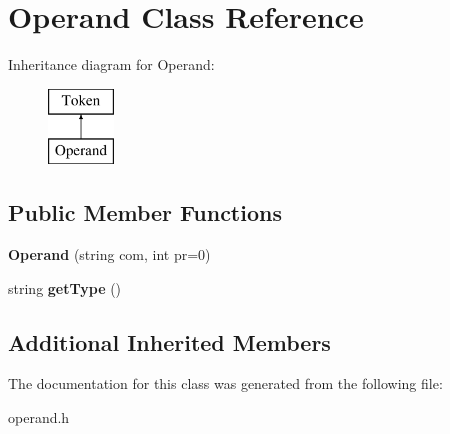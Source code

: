 \hypertarget{classOperand}{\section{Operand Class Reference}
\label{classOperand}
}
Inheritance diagram for Operand\-:\begin{figure}[H]
\begin{center}
\leavevmode
\includegraphics[height=2.000000cm]{classOperand}
\end{center}
\end{figure}
\subsection*{Public Member Functions}
\begin{DoxyCompactItemize}
\item 
\hypertarget{classOperand_a98476572f3aad95c3c5c95c25acdfeda}{{\bfseries Operand} (string com, int pr=0)}\label{classOperand_a98476572f3aad95c3c5c95c25acdfeda}

\item 
\hypertarget{classOperand_a5893a086c18e7d69ca78ae42380302c7}{string {\bfseries get\-Type} ()}\label{classOperand_a5893a086c18e7d69ca78ae42380302c7}

\end{DoxyCompactItemize}
\subsection*{Additional Inherited Members}


The documentation for this class was generated from the following file\-:\begin{DoxyCompactItemize}
\item 
operand.\-h\end{DoxyCompactItemize}
